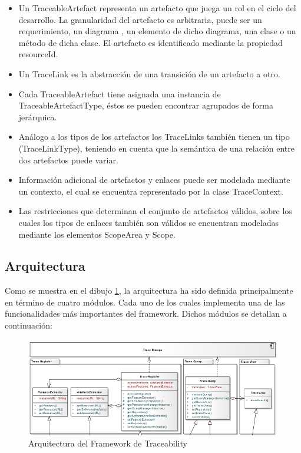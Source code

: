\documentclass[a4paper,12pt,oneside,spanish]{book}
\begin{document}
\begin{itemize}
\item Un TraceableArtefact representa un artefacto que juega un rol en el ciclo del desarrollo. La granularidad del artefacto es arbitraria, puede ser un requerimiento, un diagrama , un elemento de dicho diagrama, una clase o un método de dicha clase. El artefacto es identificado mediante la propiedad resourceId.
\item Un TraceLink es la abstracción de una transición de un artefacto a otro.
\item Cada TraceableArtefact tiene asignada una instancia de TraceableArtefactType, éstos se pueden encontrar agrupados de forma jerárquica.
 \item Análogo a los tipos de los artefactos los TraceLinks también tienen un tipo (TraceLinkType), teniendo en cuenta que la semántica de una relación entre dos artefactos puede variar.
\item Información adicional de artefactos y enlaces puede ser modelada mediante un contexto, el cual se encuentra representado por la clase TraceContext.
\item Las restricciones que determinan el conjunto de artefactos válidos, sobre los cuales los tipos de enlaces también son válidos se encuentran modeladas mediante los elementos ScopeArea y Scope.
\end{itemize}

\subsection{Arquitectura}

Como se muestra en el dibujo \ref{fig:SPLArquitectura}, la arquitectura ha sido definida principalmente en término de cuatro módulos. Cada uno de los cuales implementa una de las funcionalidades más importantes del framework. Dichos módulos se detallan a continuación:

\begin{figure}[hbtp]
\centering
\includegraphics[scale=.55]{./img/ArquitecturaTraceabilityFramework}
\caption{Arquitectura del Framework de Traceability}
\label{fig:SPLArquitectura}
\end{figure}
\end{document}
